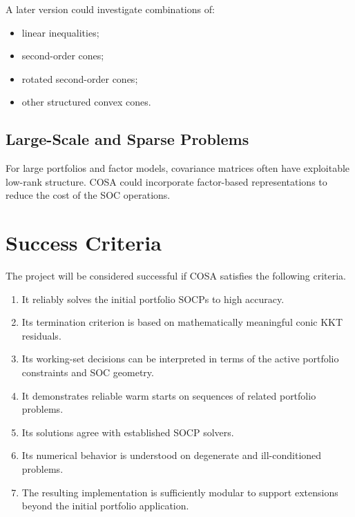 \documentclass[11pt,a4paper]{article}
\begin{document}
A later version could investigate combinations of:

\begin{itemize}
    \item linear inequalities;
    \item second-order cones;
    \item rotated second-order cones;
    \item other structured convex cones.
\end{itemize}

\subsection{Large-Scale and Sparse Problems}

For large portfolios and factor models, covariance matrices often
have exploitable low-rank structure. COSA could incorporate
factor-based representations to reduce the cost of the SOC operations.

\section{Success Criteria}

The project will be considered successful if COSA satisfies the
following criteria.

\begin{enumerate}
    \item It reliably solves the initial portfolio SOCPs to high
    accuracy.
    
    \item Its termination criterion is based on mathematically
    meaningful conic KKT residuals.
    
    \item Its working-set decisions can be interpreted in terms of
    the active portfolio constraints and SOC geometry.
    
    \item It demonstrates reliable warm starts on sequences of
    related portfolio problems.
    
    \item Its solutions agree with established SOCP solvers.
    
    \item Its numerical behavior is understood on degenerate and
    ill-conditioned problems.
    
    \item The resulting implementation is sufficiently modular to
    support extensions beyond the initial portfolio application.
\end{enumerate}
\end{document}

